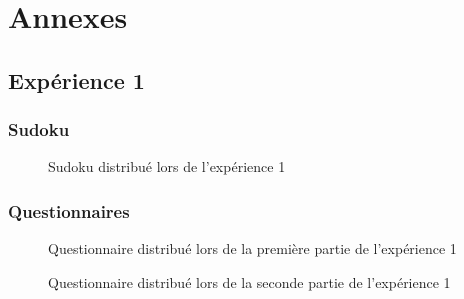 \documentclass[12pt,fleqn,oneside,french,openany]{book} %
\begin{document}
\appendix
\chapter{Annexes} \label{cha:annexes}
\section*{Expérience 1}

\subsection*{Sudoku} \label{sec:Sudoku}
\begin{figure}[htp]  %
	\caption{Sudoku distribué lors de l'expérience 1}
\end{figure}  

\clearpage
\subsection*{Questionnaires} \label{sec:Questionnaires}
\begin{figure}[htp] 
	\caption{Questionnaire distribué lors de la première partie de l'expérience 1}
\end{figure}

\clearpage
\begin{figure}[htp] 
	\caption{Questionnaire distribué lors de la seconde partie de l'expérience 1}
\end{figure}
\end{document}
